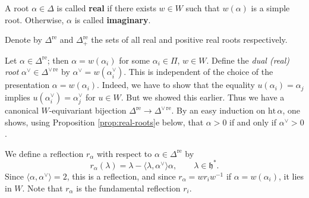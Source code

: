 \documentclass[12pt]{article}
\begin{document}
\begin{definition}
    A root $\alpha \in \Delta$ is called \textbf{real} if there exists $w \in W$ such that $w(\alpha)$ is a simple root. Otherwise, $\alpha$ is called \textbf{imaginary}.
\end{definition}
Denote by $\Delta^{\mathrm{re}}$ and $\Delta^{\mathrm{re}}_+$ the sets of all real and positive real roots respectively.

Let $\alpha \in \Delta^{\mathrm{re}}$; then $\alpha = w(\alpha_i)$ for some $\alpha_i \in \Pi$, $w \in W$. Define the \emph{dual (real) root} $\alpha^\vee \in \Delta^{\vee\,\mathrm{re}}$ by $\alpha^\vee = w(\alpha_i^\vee)$. This is independent of the choice of the presentation $\alpha = w(\alpha_i)$. Indeed, we have to show that the equality $u(\alpha_i) = \alpha_j$ implies $u(\alpha_i^\vee) = \alpha_j^\vee$ for $u \in W$. But we showed this earlier. Thus we have a canonical $W$-equivariant bijection $\Delta^{\mathrm{re}} \to \Delta^{\vee\,\mathrm{re}}$. By an easy induction on $\mathrm{ht}\,\alpha$, one shows, using Proposition \ref{prop:real-roots}e below, that $\alpha > 0$ if and only if $\alpha^\vee > 0$.

We define a reflection $r_\alpha$ with respect to $\alpha \in \Delta^{\mathrm{re}}$ by
\[
    r_\alpha(\lambda) = \lambda - \langle \lambda, \alpha^\vee\rangle \alpha, 
    \qquad \lambda \in \mathfrak{h}^*.
\]
Since $\langle \alpha,\alpha^\vee\rangle = 2$, this is a reflection, and since 
$r_\alpha = w r_i w^{-1}$ if $\alpha = w(\alpha_i)$, it lies in $W$. Note that $r_\alpha$ is the fundamental reflection $r_i$.
\end{document}
